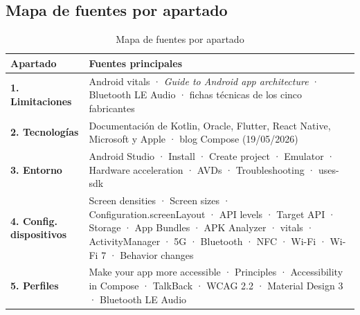 \documentclass[11pt,a4paper]{article}
\begin{document}
	\subsection*{Mapa de fuentes por apartado}
	
	{\small
		\begin{table}[htbp]
			\centering
			\begin{tabularx}{\textwidth}{@{}>{\RaggedRight\arraybackslash}p{3.5cm} >{\RaggedRight\arraybackslash}X@{}}
				\toprule
				\rowcolor{primary}
				\textcolor{paper}{\sffamily\bfseries Apartado} & \textcolor{paper}{\sffamily\bfseries Fuentes principales} \\
				\midrule
				\textbf{1. Limitaciones} & Android vitals · \emph{Guide to Android app architecture} · Bluetooth LE Audio · fichas técnicas de los cinco fabricantes \\
				\rowcolor{soft}
				\textbf{2. Tecnologías} & Documentación de Kotlin, Oracle, Flutter, React Native, Microsoft y Apple · blog Compose (19/05/2026) \\
				\textbf{3. Entorno} & Android Studio · Install · Create project · Emulator · Hardware acceleration · AVDs · Troubleshooting · uses-sdk \\
				\rowcolor{soft}
				\textbf{4. Config. dispositivos} & Screen densities · Screen sizes · Configuration.screenLayout · API levels · Target API · Storage · App Bundles · APK Analyzer · vitals · ActivityManager · 5G · Bluetooth · NFC · Wi-Fi · Wi-Fi 7 · Behavior changes \\
				\textbf{5. Perfiles} & Make your app more accessible · Principles · Accessibility in Compose · TalkBack · WCAG 2.2 · Material Design 3 · Bluetooth LE Audio \\
				\bottomrule
			\end{tabularx}
			\caption{Mapa de fuentes por apartado}
		\end{table}
	}
	
\end{document}
